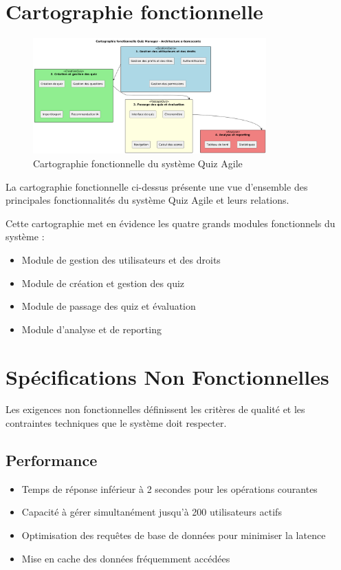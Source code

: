 \documentclass[12pt,a4paper]{report}
\begin{document}
\section{Cartographie fonctionnelle}

\begin{figure}[H]
\centering
\includegraphics[width=0.8\textwidth]{latex_media/media/image11.png}
\caption{Cartographie fonctionnelle du système Quiz Agile}
\label{fig:cartographie-fonctionnelle}
\end{figure}

La cartographie fonctionnelle ci-dessus présente une vue d'ensemble des principales fonctionnalités du système Quiz Agile et leurs relations.

Cette cartographie met en évidence les quatre grands modules fonctionnels du système :
\begin{itemize}
\item Module de gestion des utilisateurs et des droits
\item Module de création et gestion des quiz
\item Module de passage des quiz et évaluation
\item Module d'analyse et de reporting
\end{itemize}

\section{Spécifications Non Fonctionnelles}

Les exigences non fonctionnelles définissent les critères de qualité et les contraintes techniques que le système doit respecter.

\subsection{Performance}

\begin{itemize}
\item Temps de réponse inférieur à 2 secondes pour les opérations courantes
\item Capacité à gérer simultanément jusqu'à 200 utilisateurs actifs
\item Optimisation des requêtes de base de données pour minimiser la latence
\item Mise en cache des données fréquemment accédées
\end{itemize}
\end{document}
